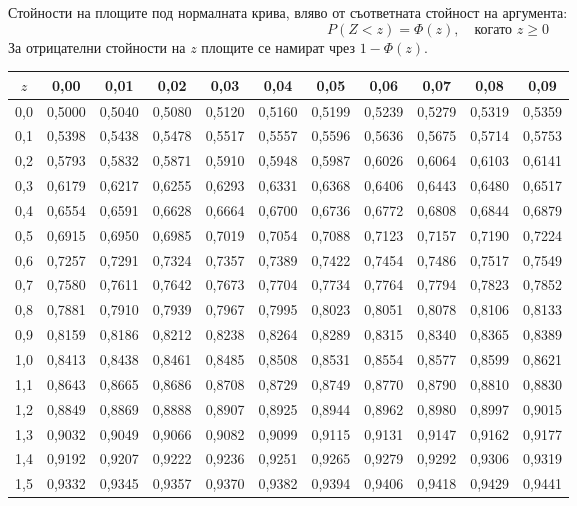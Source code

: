 \documentclass[12pt,a4paper]{article}
\begin{document}
Стойности на площите под нормалната крива, вляво от съответната стойност на аргумента:
$$P(Z<z)=\Phi(z),\quad \text{когато } z\ge0$$
За отрицателни стойности на $z$ площите се намират чрез $1-\Phi(z)$.

\begin{center}
\small
\renewcommand{\arraystretch}{1.2}
\begin{tabular}{c*{10}{c}}
\toprule
$z$ & 0,00 & 0,01 & 0,02 & 0,03 & 0,04 & 0,05 & 0,06 & 0,07 & 0,08 & 0,09 \\
\midrule
0,0 & 0,5000 & 0,5040 & 0,5080 & 0,5120 & 0,5160 & 0,5199 & 0,5239 & 0,5279 & 0,5319 & 0,5359 \\
0,1 & 0,5398 & 0,5438 & 0,5478 & 0,5517 & 0,5557 & 0,5596 & 0,5636 & 0,5675 & 0,5714 & 0,5753 \\
0,2 & 0,5793 & 0,5832 & 0,5871 & 0,5910 & 0,5948 & 0,5987 & 0,6026 & 0,6064 & 0,6103 & 0,6141 \\
0,3 & 0,6179 & 0,6217 & 0,6255 & 0,6293 & 0,6331 & 0,6368 & 0,6406 & 0,6443 & 0,6480 & 0,6517 \\
0,4 & 0,6554 & 0,6591 & 0,6628 & 0,6664 & 0,6700 & 0,6736 & 0,6772 & 0,6808 & 0,6844 & 0,6879 \\
0,5 & 0,6915 & 0,6950 & 0,6985 & 0,7019 & 0,7054 & 0,7088 & 0,7123 & 0,7157 & 0,7190 & 0,7224 \\
0,6 & 0,7257 & 0,7291 & 0,7324 & 0,7357 & 0,7389 & 0,7422 & 0,7454 & 0,7486 & 0,7517 & 0,7549 \\
0,7 & 0,7580 & 0,7611 & 0,7642 & 0,7673 & 0,7704 & 0,7734 & 0,7764 & 0,7794 & 0,7823 & 0,7852 \\
0,8 & 0,7881 & 0,7910 & 0,7939 & 0,7967 & 0,7995 & 0,8023 & 0,8051 & 0,8078 & 0,8106 & 0,8133 \\
0,9 & 0,8159 & 0,8186 & 0,8212 & 0,8238 & 0,8264 & 0,8289 & 0,8315 & 0,8340 & 0,8365 & 0,8389 \\
1,0 & 0,8413 & 0,8438 & 0,8461 & 0,8485 & 0,8508 & 0,8531 & 0,8554 & 0,8577 & 0,8599 & 0,8621 \\
1,1 & 0,8643 & 0,8665 & 0,8686 & 0,8708 & 0,8729 & 0,8749 & 0,8770 & 0,8790 & 0,8810 & 0,8830 \\
1,2 & 0,8849 & 0,8869 & 0,8888 & 0,8907 & 0,8925 & 0,8944 & 0,8962 & 0,8980 & 0,8997 & 0,9015 \\
1,3 & 0,9032 & 0,9049 & 0,9066 & 0,9082 & 0,9099 & 0,9115 & 0,9131 & 0,9147 & 0,9162 & 0,9177 \\
1,4 & 0,9192 & 0,9207 & 0,9222 & 0,9236 & 0,9251 & 0,9265 & 0,9279 & 0,9292 & 0,9306 & 0,9319 \\
1,5 & 0,9332 & 0,9345 & 0,9357 & 0,9370 & 0,9382 & 0,9394 & 0,9406 & 0,9418 & 0,9429 & 0,9441 \\

\end{tabular}
\end{center}
\end{document}
